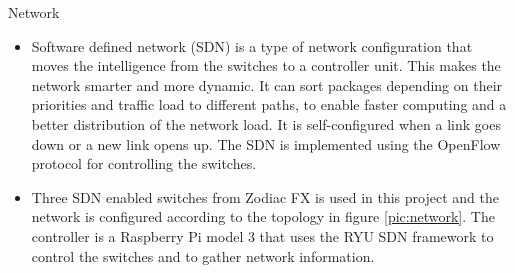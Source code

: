 \documentclass[final,hyperref={pdfpagelabels=false}]{beamer}
\begin{document}
\begin{frame}[t]
\begin{columns}[t]
\begin{column}{.465\textwidth}
%
%
%
%        
%
%
%    
%

\begin{block}{Network}
    \begin{itemize}
        \item Software defined network (SDN) is a type of network configuration that moves the intelligence from the switches to a controller unit. This makes the network smarter and more dynamic. It can sort packages depending on their priorities and traffic load to different paths, to enable faster computing and a better distribution of the network load. It is self-configured when a link goes down or a new link opens up. The SDN is implemented using the OpenFlow protocol for controlling the switches. 
        
        \item Three SDN enabled switches from Zodiac FX is used in this project and the network is configured according to the topology in figure \ref{pic:network}. The controller is a Raspberry Pi model 3 that uses the RYU SDN framework to control the switches and to gather network information. 
        

\end{itemize}
\end{block}
\end{column}
\end{columns}
\end{frame}
\end{document}
